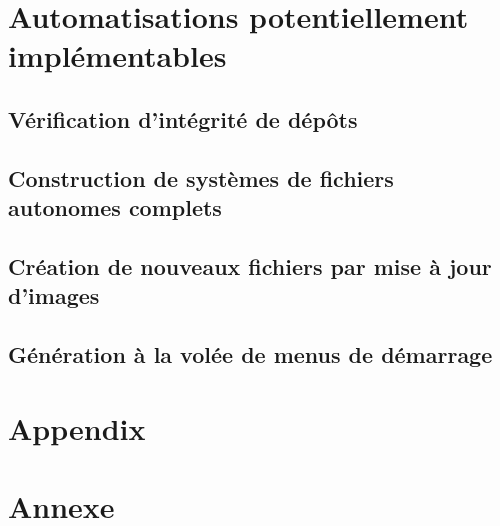 \ml
{\chapter{\todo}}
{\chapter{Automatisations potentiellement implémentables}}

\ml
{\section{\todo}}
{\section{Vérification d’intégrité de dépôts}}

\ml
{\section{\todo}}
{\section{Construction de systèmes de fichiers autonomes complets}}

\ml
{\section{\todo}}
{\section{Création de nouveaux fichiers par mise à jour d’images}}

\ml
{\section{\todo}}
{\section{Génération à la volée de menus de démarrage}}



\appendix

\ml
{\chapter{Appendix}}
{\chapter{Annexe}}
\pagebreak





\singlespacing




